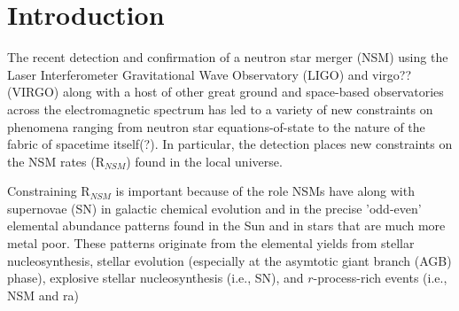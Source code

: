 \section{Introduction}
\label{intro} 
The recent detection and confirmation of a neutron star merger (NSM) using the Laser Interferometer Gravitational Wave Observatory (LIGO) and virgo?? (VIRGO) along with a host of other great ground and space-based observatories across the electromagnetic spectrum has led to a variety of new constraints on phenomena ranging from neutron star equations-of-state to the nature of the fabric of spacetime itself(?). In particular, the detection places new constraints on the NSM rates (R$_{NSM}$) found in the local universe. 

Constraining R$_{NSM}$ is important because of the role NSMs have along with supernovae (SN) in galactic chemical evolution and in the precise 'odd-even' elemental abundance patterns found in the Sun and in stars that are much more metal poor. These patterns originate from the elemental yields from stellar nucleosynthesis, stellar evolution (especially at the asymtotic giant branch (AGB) phase), explosive stellar nucleosynthesis (i.e., SN), and $r$-process-rich events (i.e., NSM and ra)

